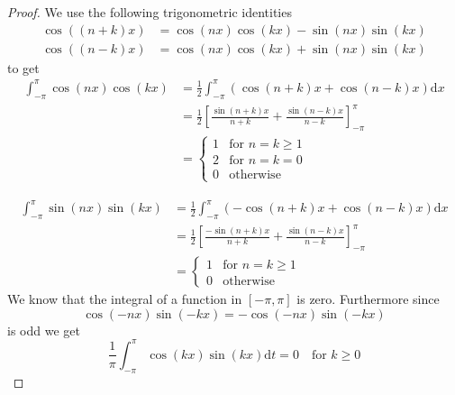 \documentclass[11pt, oneside]{article}   	%
\newtheorem{proof}{Proof}
\begin{document}
\begin{proof}
We use the following trigonometric identities 
\begin{equation}
\begin{split}
\cos((n+k)x) &= \cos(nx)\cos(kx) - \sin(nx)\sin(kx)\\
\cos((n-k)x) &= \cos(nx)\cos(kx) + \sin(nx)\sin(kx) \nonumber
\end{split}
\end{equation}
to get 
\begin{equation}
\begin{split}
\int_{-\pi}^{\pi} \cos(nx)\cos(kx) &= \frac{1}{2}\int_{-\pi}^{\pi}(\cos(n+k)x + \cos(n-k)x)\mathrm{d}x \\
&=\frac{1}{2}\left [  \frac{\sin(n+k)x}{n+k} + \frac{\sin(n-k)x}{n-k} \right ]_{-\pi}^{\pi}\\
&=\begin{cases}
  1 & \text{for } n=k \geq 1\\    
  2 & \text{for } n = k = 0\\
  0 & \text{otherwise}  
\end{cases}  \nonumber 
\end{split}
\end{equation}

\begin{equation}
\begin{split}
\int_{-\pi}^{\pi} \sin(nx)\sin(kx) &= \frac{1}{2}\int_{-\pi}^{\pi}(-\cos(n+k)x + \cos(n-k)x)\mathrm{d}x \\
&=\frac{1}{2}\left [  \frac{-\sin(n+k)x}{n+k} + \frac{\sin(n-k)x}{n-k} \right ]_{-\pi}^{\pi}\\
&=\begin{cases}
  1 & \text{for } n=k \geq 1\\    
  0 & \text{otherwise}  
\end{cases}  \nonumber 
\end{split}
\end{equation}
We know that the integral of a function in $[-\pi, \pi]$ is zero. Furthermore since
\begin{equation}
\cos(-nx)\sin(-kx) = - \cos(-nx)\sin(-kx) \nonumber
\end{equation}
is odd we get 
\begin{equation}
 \frac{1}{\pi}\int_{-\pi}^{\pi} \cos(kx)\sin(kx) \mathrm{d}t = 0 \quad \text{for } k\geq 0
\end{equation}
\end{proof}
\end{document}
